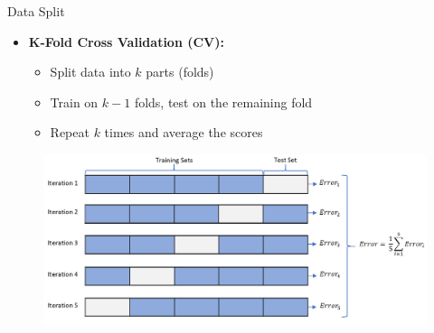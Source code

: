 \begin{frame}{Data Split}
\begin{itemize}
    \item \textbf{K-Fold Cross Validation (CV):}
    \begin{itemize}
        \item Split data into $k$ parts (folds)
        \item Train on $k - 1$ folds, test on the remaining fold
        \item Repeat $k$ times and average the scores
    \end{itemize}
\end{itemize}

\begin{figure}
    \centering
    \includegraphics[width=0.9\linewidth]{images/linear-regression/linear-regression-21.png}
\end{figure}
\end{frame}
